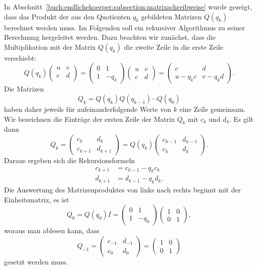 In Abschnitt~\ref{buch:endlichekoerper:subsection:matrixschreibweise}
wurde gezeigt, dass das Produkt der aus den Quotienten $q_k$ gebildeten
Matrizen $Q(q_k)$ berechnet werden muss.
Im Folgenden soll ein rekursiver Algorithmus zu seiner Berechnung
hergeleitet werden.
Dazu beachten wir zunächst, dass die Multiplikation mit der Matrix
$Q(q_k)$ die zweite Zeile in die erste Zeile verschiebt:
\[
Q(q_k)
\begin{pmatrix}
u&v\\
c&d\\
\end{pmatrix}
=
\begin{pmatrix}0&1\\1&-q_k\end{pmatrix}
\begin{pmatrix}
u&v\\
c&d
\end{pmatrix}
=
\begin{pmatrix}
c&d\\
u-q_kc&v-q_kd
\end{pmatrix}.
\]
Die Matrizen
\[
Q_k = Q(q_k)Q(q_{k-1})\cdots Q(q_0)
\]
haben daher jeweils für aufeinanderfolgende Werte von $k$ eine Zeile
gemeinsam.
Wir bezeichnen die Einträge der ersten Zeile der Matrix $Q_k$ mit
$c_k$ und $d_k$.
Es gilt dann
\[
Q_k
=
\begin{pmatrix}
c_{k}  &d_{k}  \\
c_{k+1}&d_{k+1}
\end{pmatrix}
=
Q(q_k)
\begin{pmatrix}
c_{k-1}&d_{k-1}\\
c_{k}  &d_{k}
\end{pmatrix}.
\]
Daraus ergeben sich die Rekursionsformeln
\begin{equation}
\begin{aligned}
c_{k+1}&=c_{k-1}-q_kc_k\\
d_{k+1}&=d_{k-1}-q_kd_k.
\end{aligned}
\label{buch:endlichekoerper:eqn:cdrekursion}
\end{equation}
Die Auswertung des Matrizenproduktes von links nach rechts beginnt mit
der Einheitsmatrix, es ist
\[
Q_0
=
Q(q_0) I
=
\begin{pmatrix}
0&1\\
1&-q_0
\end{pmatrix}
\begin{pmatrix}
1&0\\0&1\end{pmatrix},
\]
woraus man ablesen kann, dass
\begin{equation}
Q_{-1}
=
\begin{pmatrix}
c_{-1}&d_{-1}\\
c_0&d_0
\end{pmatrix}
=
\begin{pmatrix}
1&0\\
0&1
\end{pmatrix}
\label{buch:endlichekoerper:eqn:cdinitial}
\end{equation}
gesetzt werden muss.

